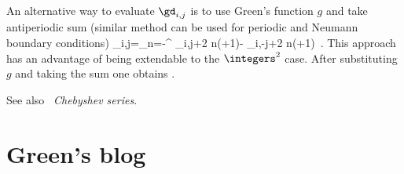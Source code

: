 An alternative  way to evaluate   $\gd_{i,j}$   is to use  Green's
function $g$ and take antiperiodic sum (similar method can be used for
periodic and Neumann  boundary conditions)
\beq
   \gd_{i,j}=\sum_{n=-\infty}^{\infty}
               \gd_{i,j+2 n(\cl{}+1)}- \gd_{i,-j+2 n(\cl{}+1)}
\,.
This approach has an advantage of being extendable  to the $\integers^2$
case. After substituting $g$ and taking the sum one obtains
.

See also ~{\em Chebyshev series}.

\renewcommand{\Ssym}[1]{{\ensuremath{m_{#1}}}}    %

\section{Green's blog}
\label{sect:blog1dGreen}

